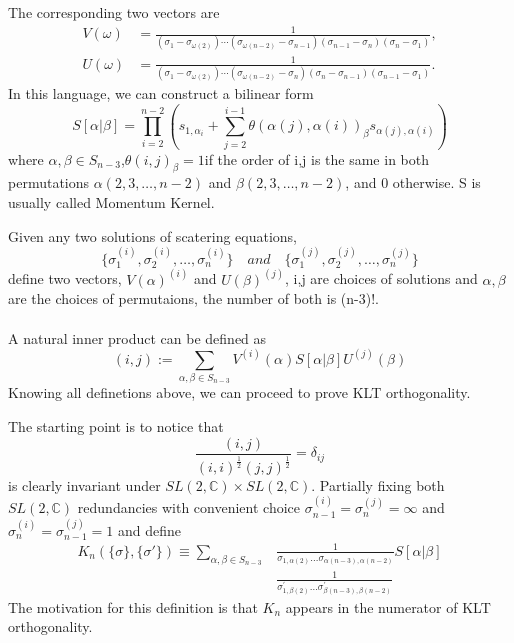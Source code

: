 \documentclass{beamer}
\begin{document}
\begin{frame}
    The corresponding two vectors are 
    \begin{align*}V(\omega)&=\frac1{(\sigma_1-\sigma_{\omega(2)})\cdots(\sigma_{\omega(n-2)}-\sigma_{n-1})(\sigma_{n-1}-\sigma_n)(\sigma_n-\sigma_1)},\\U(\omega)&=\frac1{(\sigma_1-\sigma_{\omega(2)})\cdots(\sigma_{\omega(n-2)}-\sigma_n)(\sigma_n-\sigma_{n-1})(\sigma_{n-1}-\sigma_1)}.
    \end{align*}
    In this language, we can construct a bilinear form 
    \begin{equation*}
        S[\alpha|\beta]=\prod^{n-2}_{i=2}\left(s_{1,\alpha_i}+\sum_{j=2}^{i-1}
        \theta(\alpha(j),\alpha(i))_\beta s_{\alpha(j),\alpha(i)}\right)
    \end{equation*}
    where $\alpha,\beta\in S_{n-3}$,$\theta(i,j)_\beta=1$if the order of i,j is the same in both permutations 
    $\alpha(2,3,\dots,n-2)$ and $\beta(2,3,\dots,n-2)$, and 0 otherwise.
    S is usually called \alert{Momentum Kernel}.
\end{frame}
\begin{frame}
    Given any two solutions of scatering equations,
    \begin{equation*}
        \{\sigma_1^{(i)},\sigma_2^{(i)},\dots,\sigma_n^{(i)}\}\quad and \quad \{\sigma_1^{(j)},\sigma_2^{(j)},\dots,\sigma_n^{(j)}\}
    \end{equation*}
    define two vectors, $V(\alpha)^{(i)}$ and $U(\beta)^{(j)}$, i,j are choices of solutions and $\alpha,\beta$ are the choices of permutaions,
    the number of both is \alert{(n-3)!}.
    \\ \hspace*{\fill}\\
    A natural inner product can be defined as
    \begin{equation*}
        (i,j):=\sum_{\alpha,\beta\in S_{n-3}}V^{(i)}(\alpha)S[\alpha|\beta]U^{(j)}(\beta)
    \end{equation*}
    Knowing all definetions above, we can proceed to prove KLT orthogonality.
\end{frame}
\begin{frame}
    The starting point is to notice that
    \begin{equation*}
        \frac{(i,j)}{(i,i)^{\frac12}(j,j)^{\frac12}}=\delta_{ij}
    \end{equation*}
    is clearly invariant under $SL(2,\mathbb{C})\times SL(2,\mathbb{C})$. Partially fixing both $SL(2,\mathbb{C})$
    redundancies with convenient choice $\sigma_{n-1}^{(i)}=\sigma_n^{(j)}=\infty$ and $\sigma_n^{(i)}=\sigma_{n-1}^{(j)}=1$
    and define 
    \begin{align*}
            K_n(\{\sigma\},\{\sigma'\})\equiv\sum_{\alpha,\beta\in S_{n-3}}&\frac1{\sigma_{1,\alpha(2)}\ldots\sigma_{\alpha(n-3),\alpha(n-2)}}S[\alpha|\beta]\\
            &\frac1{\sigma_{1,\beta(2)}^{\prime}\ldots\sigma_{\beta(n-3),\beta(n-2)}^{\prime}}
    \end{align*}
    The motivation for this definition is that $K_n$ appears in the numerator of KLT orthogonality.
\end{frame}
\end{document}
